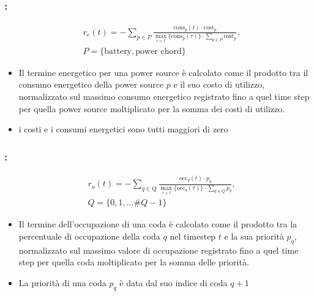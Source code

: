 \documentclass[compress]{beamer}
\begin{document}
\begin{frame}
    \frametitle{\subsecname: \subsubsecname}
    \begin{Definition}
        \begin{equation}
            \label{eq:reward_energy}
            \begin{aligned}
                & r_e(t) = -\sum_{p \in P}\frac{\text{cons}_p(t) \cdot \text{cost}_p}{\max_{\tau < t}\{\text{cons}_p(\tau)\} \cdot \sum_{p \in P}\text{cost}_p},\\
                & P = \{\text{battery}, \text{power chord}\} 
            \end{aligned}
        \end{equation}
    \end{Definition}
    \begin{itemize}
        \item Il termine energetico per una power source è calcolato come il prodotto tra il consumo energetico della power source $p$ e il
        suo costo di utilizzo, normalizzato sul massimo consumo energetico registrato fino
        a quel time step per quella power source moltiplicato per la somma dei costi di utilizzo.
        \item i costi e i consumi energetici sono tutti maggiori di zero
    \end{itemize}
\end{frame}
\begin{frame}
    \frametitle{\subsecname: \subsubsecname}
    \begin{Definition}
        \begin{equation}
            \label{eq:reward_occupancy}
            \begin{aligned}
                & r_o(t) = -\sum_{q \in Q}\frac{\text{occ}_q(t) \cdot p_q}{\max_{\tau < t}\{\text{occ}_q(\tau)\} \cdot \sum_{q \in Q}p_q},\\
                & Q = \{0, 1, \dots \#Q - 1\} 
            \end{aligned}
        \end{equation}
    \end{Definition}
    \begin{itemize}
        \item Il termine dell'occupazione di una coda è calcolato come il prodotto tra la percentuale di occupazione della coda $q$ nel 
        timestep $t$ e la sua priorità $p_q$, normalizzato sul massimo valore di occupazione
        registrato fino a quel time step per quella coda moltiplicato per la somma delle priorità.
        \item La priorità di una coda $p_q$ è data dal suo indice di coda $q + 1$ 
    \end{itemize}
\end{frame}
\end{document}
